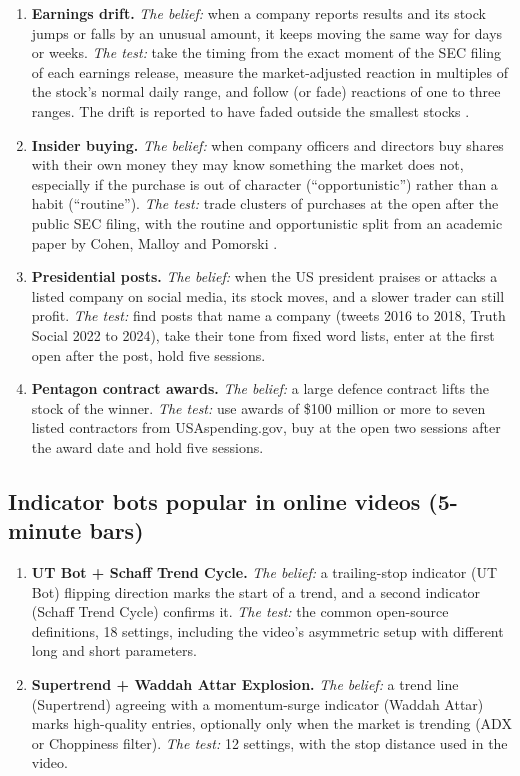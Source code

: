 \documentclass[11pt,a4paper]{article}
\providecommand{\tightlist}{\setlength{\itemsep}{0pt}\setlength{\parskip}{0pt}}
\begin{document}
\begin{enumerate}
\def\labelenumi{\arabic{enumi}.}
\setcounter{enumi}{4}
\tightlist
\item
  \textbf{Earnings drift.} \emph{The belief:} when a company reports results and its stock jumps or falls by an unusual amount, it keeps
  moving the same way for days or weeks. \emph{The test:} take the timing from the exact moment of the SEC filing of each
  earnings release, measure the market-adjusted reaction in multiples of the stock's normal daily range, and follow (or
  fade) reactions of one to three ranges. The drift is reported to have faded outside the smallest stocks \cite{martineau2022}.
\item
  \textbf{Insider buying.} \emph{The belief:} when company officers and directors buy shares with their own money they may know something
  the market does not, especially if the purchase is out of character (``opportunistic'') rather than a habit (``routine'').
  \emph{The test:} trade clusters of purchases at the open after the public SEC filing, with the routine and opportunistic split
  from an academic paper by Cohen, Malloy and Pomorski \cite{cohen2012}.
\item
  \textbf{Presidential posts.} \emph{The belief:} when the US president praises or attacks a listed company on social media, its stock
  moves, and a slower trader can still profit. \emph{The test:} find posts that name a company (tweets 2016 to 2018, Truth Social
  2022 to 2024), take their tone from fixed word lists, enter at the first open after the post, hold five sessions.
\item
  \textbf{Pentagon contract awards.} \emph{The belief:} a large defence contract lifts the stock of the winner. \emph{The test:} use awards of
  \$100 million or more to seven listed contractors from USAspending.gov, buy at the open two sessions after the award
  date and hold five sessions.
\end{enumerate}

\subsection{Indicator bots popular in online videos (5-minute bars)}\label{indicator-bots-popular-in-online-videos-5-minute-bars}

\begin{enumerate}
\def\labelenumi{\arabic{enumi}.}
\setcounter{enumi}{8}
\tightlist
\item
  \textbf{UT Bot + Schaff Trend Cycle.} \emph{The belief:} a trailing-stop indicator (UT Bot) flipping direction marks the start of a
  trend, and a second indicator (Schaff Trend Cycle) confirms it. \emph{The test:} the common open-source definitions, 18 settings,
  including the video's asymmetric setup with different long and short parameters.
\item
  \textbf{Supertrend + Waddah Attar Explosion.} \emph{The belief:} a trend line (Supertrend) agreeing with a momentum-surge indicator
  (Waddah Attar) marks high-quality entries, optionally only when the market is trending (ADX or Choppiness filter).
  \emph{The test:} 12 settings, with the stop distance used in the video.
\end{enumerate}
\end{document}
